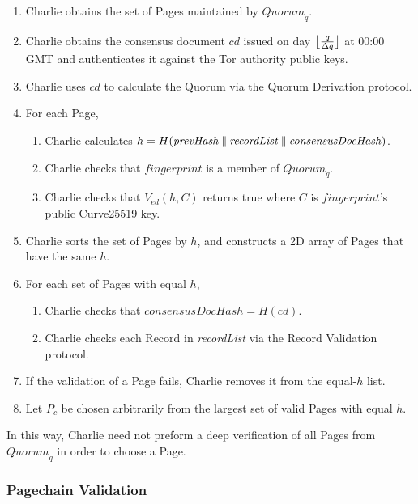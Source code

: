 \begin{enumerate}
	\item Charlie obtains the set of Pages maintained by $ \mathit{Quorum}_{q} $.
	\item Charlie obtains the consensus document $ \mathit{cd} $ issued on day $ \floor[\big]{\frac{q}{\Delta q}} $ at 00:00 GMT and authenticates it against the Tor authority public keys.
	\item Charlie uses $ \mathit{cd} $ to calculate the Quorum via the Quorum Derivation protocol.
	\item For each Page, 
		\begin{enumerate}
			\item Charlie calculates $ h = H(\mathit{prevHash} \concat \mathit{recordList} \concat \mathit{consensusDocHash}) $.
			\item Charlie checks that $ \mathit{fingerprint} $ is a member of $ \mathit{Quorum}_{q} $.
			\item Charlie checks that $ V_{\mathit{ed}}(h, C) $ returns true where $ C $ is $ \mathit{fingerprint} $'s public Curve25519 key.
		\end{enumerate}
	\item Charlie sorts the set of Pages by $ h $, and constructs a 2D array of Pages that have the same $ h $.
	\item For each set of Pages with equal $ h $, 
		\begin{enumerate}
			\item Charlie checks that $ \mathit{consensusDocHash} = H(\mathit{cd}) $.
			\item Charlie checks each Record in \emph{recordList} via the Record Validation protocol.
		\end{enumerate}
	\item If the validation of a Page fails, Charlie removes it from the equal-$ h $ list.
	\item Let $ P_{c} $ be chosen arbitrarily from the largest set of valid Pages with equal $ h $.
\end{enumerate}

In this way, Charlie need not preform a deep verification of all Pages from $ \mathit{Quorum}_{q} $ in order to choose a Page.

\subsubsection{Pagechain Validation}


